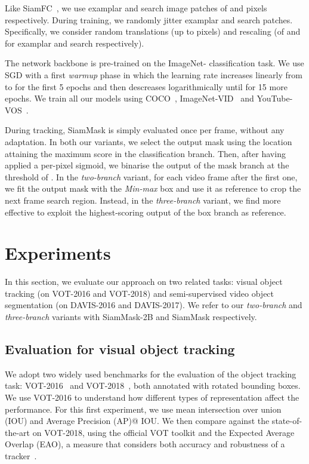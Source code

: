 \documentclass[10pt,twocolumn,letterpaper]{article}
\newcommand{\mypar}[1]{\smallskip\noindent {\bf #1}\enskip}
\begin{document}
\mypar{Training.}
Like SiamFC~\cite{bertinetto2016fully}, we use examplar and search image patches of  and  pixels respectively.
During training, we randomly jitter examplar and search patches.
Specifically, we consider random translations (up to  pixels) and rescaling (of  and  for examplar and search respectively).

The network backbone is pre-trained on the \mbox{ImageNet-} classification task.
We use SGD with a first \emph{warmup} phase in which the learning rate increases linearly from  to  for the first 5 epochs and then descreases logarithmically until  for 15 more epochs.
We train all our models using COCO~\cite{lin2014microsoft}, ImageNet-VID~\cite{russakovsky2015imagenet} and YouTube-VOS~\cite{xu2018youtube}. 

\mypar{Inference.}
During tracking, SiamMask is simply evaluated once per frame, without any adaptation.
In both our variants, we select the output mask using the location attaining the maximum score in the classification branch.
Then, after having applied a per-pixel sigmoid, we binarise the output of the mask branch at the threshold of .
In the \textit{two-branch} variant, for each video frame after the first one, we fit the output mask with the \emph{Min-max} box and use it as reference to crop the next frame search region.
Instead, in the \textit{three-branch} variant, we find more effective to exploit the highest-scoring output of the box branch as reference.

 
\section{Experiments}
\label{sec:experiments}
In this section, we evaluate our approach on two related tasks: visual object tracking (on VOT-2016 and VOT-2018) and semi-supervised video object segmentation (on DAVIS-2016 and DAVIS-2017).
We refer to our \emph{two-branch} and \emph{three-branch} variants with SiamMask-2B and SiamMask respectively.

\subsection{Evaluation for visual object tracking}
\label{sec:exp_track}

\mypar{Datasets and settings.}
We adopt two widely used benchmarks for the evaluation of the object tracking task: VOT-2016~\cite{kristan2016visual} and VOT-2018~\cite{VOT2018}, both annotated with rotated bounding boxes.
We use VOT-2016 to understand how different types of representation affect the performance.
For this first experiment, we use mean intersection over union (IOU) and Average Precision (AP)@ IOU.
We then compare against the state-of-the-art on VOT-2018, using the official VOT toolkit and the Expected Average Overlap (EAO), a measure that considers both accuracy and robustness of a tracker~\cite{VOT2018}.
\end{document}

